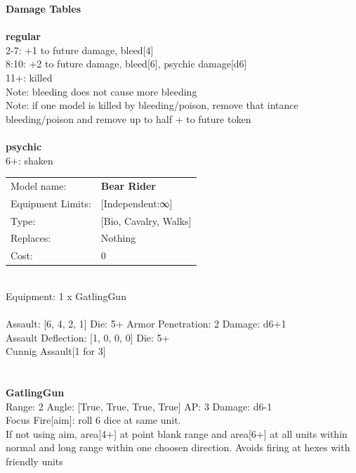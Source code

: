 {\bf Damage Tables} \\
\ \\ {\bf regular } \\
2-7: +1 to future damage, bleed[4] \\
8:10: +2 to future damage, bleed[6], psychic damage[d6] \\
11+: killed \\
Note: bleeding does not cause more bleeding \\
Note: if one model is killed by bleeding/poison, remove that intance \\ bleeding/poison and remove up to half + to future token \\
\ \\ {\bf psychic } \\
6+: shaken \\


\noindent
\begin{tabular}{ll}
Model name: &{\bf Bear Rider } \\
Equipment Limits: &[Independent:∞] \\
Type: &[Bio, Cavalry, Walks] \\
Replaces: &Nothing \\
Cost: & 0\\
\end{tabular}
\ \\
Equipment: 1 x GatlingGun \\
\ \\
Assault: [6, 4, 2, 1] Die: 5+ Armor Penetration: 2 Damage: d6+1 \\
Assault Deflection: [1, 0, 0, 0] Die: 5+\\
\indent Cunnig Assault[1 for 3]\\ 
 
\ \\

\ \\
{\bf GatlingGun } \\



Range: 2  Angle: [True, True, True, True] AP: 3 Damage: d6-1 \\
Focus Fire[aim]: roll 6 dice at same unit.\\ 
If not using aim, area[4+] at point blank range and area[6+] at all units within normal and long range within one choosen direction. Avoids firing at hexes with friendly units\\ 




